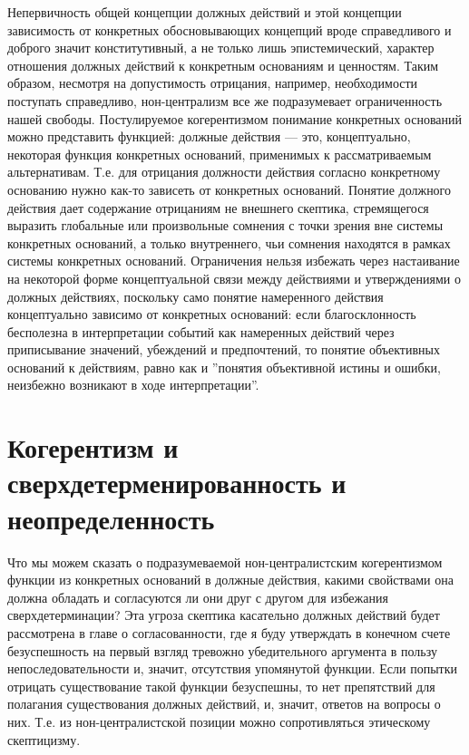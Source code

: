 \documentclass[11pt]{book}
\begin{document}
Непервичность общей концепции должных действий и этой концепции зависимость от конкретных обосновывающих концепций вроде справедливого и доброго значит конститутивный, а не только лишь эпистемический, характер отношения должных действий к конкретным основаниям и ценностям. Таким образом, несмотря на допустимость отрицания, например, необходимости поступать справедливо, нон-централизм все же подразумевает ограниченность нашей свободы. Постулируемое когерентизмом понимание конкретных оснований можно представить функцией: должные действия --- это, концептуально, некоторая функция конкретных оснований, применимых к рассматриваемым альтернативам. Т.е. для отрицания должности действия согласно конкретному основанию нужно как-то зависеть от конкретных оснований. Понятие должного действия дает содержание отрицаниям не внешнего скептика, стремящегося выразить глобальные или произвольные сомнения с точки зрения вне системы конкретных оснований, а только внутреннего, чьи сомнения находятся в рамках системы конкретных оснований. Ограничения нельзя избежать через настаивание на некоторой форме концептуальной связи между действиями и утверждениями о должных действиях, поскольку само понятие намеренного действия концептуально зависимо от конкретных оснований: если благосклонность бесполезна в интерпретации событий как намеренных действий через приписывание значений, убеждений и предпочтений, то понятие объективных оснований к действиям, равно как и ''понятия объективной истины и ошибки, неизбежно возникают в ходе интерпретации''.

\section{Когерентизм и сверхдетерменированность и неопределенность}

Что мы можем сказать о подразумеваемой нон-централистским когерентизмом функции из конкретных оснований в должные действия, какими свойствами она должна обладать и согласуются ли они друг с другом для избежания сверхдетерминации? Эта угроза скептика касательно должных действий будет рассмотрена в главе о согласованности, где я буду утверждать в конечном счете безуспешность на первый взгляд тревожно убедительного аргумента в пользу непоследовательности и, значит, отсутствия упомянутой функции. Если попытки отрицать существование такой функции безуспешны, то нет препятствий для полагания существования должных действий, и, значит, ответов на вопросы о них. Т.е. из нон-централистской позиции можно сопротивляться этическому скептицизму.
\end{document}
